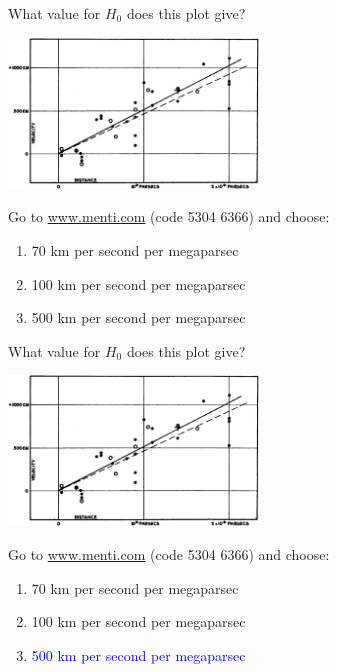\documentclass[usenames,dvipsnames,12pt,compress]{beamer}
\newcommand{\mentiurl}[0]{{\url{www.menti.com}}}
\newcommand{\menticode}[0]{{5304 6366}}
\newcommand{\mentiinvitation}[0]{Go to \mentiurl{} (code \menticode{}) and choose:\\}
\newcommand{\correctanswer}[1]{\textcolor{blue}{{#1} \checkmark}}
\begin{document}
\begin{frame}{What value for $H_0$ does this plot give?}
  \begin{block}{}
  \includegraphics[height=4cm]{F2.large.jpg}
  \end{block}
  \begin{block}{}
    \mentiinvitation{}
    \begin{enumerate}
      \item{70 km per second per megaparsec}
      \item{100 km per second per megaparsec}
      \item{500 km per second per megaparsec}
    \end{enumerate}
  \end{block}
\end{frame}


\begin{frame}{What value for $H_0$ does this plot give?}
  \begin{block}{}
  \includegraphics[height=4cm]{F2.large.jpg}
  \end{block}
  \begin{block}{}
    \mentiinvitation{}
    \begin{enumerate}
      \item{70 km per second per megaparsec}
      \item{100 km per second per megaparsec}
      \item{\correctanswer{500 km per second per megaparsec}}
    \end{enumerate}
  \end{block}
\end{frame}
\end{document}

